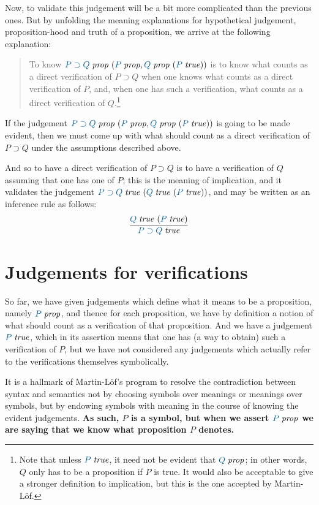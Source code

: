 Now, to validate this judgement will be a bit more complicated than the
previous ones. But by unfolding the meaning explanations for hypothetical
judgement, proposition-hood and truth of a proposition, we arrive at the
following explanation:
\begin{quote}
  To know $\hyp{\isprop{P\supset Q}}{\isprop{P},\hyp{\isprop{Q}}{\istrue{P}}}$
  is to know what counts as a direct verification of $P\supset Q$ when one
  knows what counts as a direct verification of $P$, and, when one has such a
  verification, what counts as a direct verification of $Q$.\footnote{Note that
  unless $\istrue{P}$, it need not be evident that $\isprop{Q}$; in other
  words, $Q$ only has to be a proposition if $P$ is true. It would also be
  acceptable to give a stronger definition to implication, but this is the one
  accepted by Martin-L\"of.}
\end{quote}


If the judgement $\hyp{\isprop{P\supset
Q}}{\isprop{P},\hyp{\isprop{Q}}{\istrue{P}}}$ is going to be made evident, then
we must come up with what should count as a direct verification of $P\supset Q$
under the assumptions described above.

And so to have a direct verification of $P\supset Q$ is to have a
verification of $Q$ assuming that one has one of $P$; this is the
meaning of implication, and it validates the judgement
$\hyp{\istrue{P\supset Q}}{\hyp{\istrue{Q}}{\istrue{P}}}$, and may be
written as an inference rule as follows:
\[
  \infer{
    \istrue{P\supset Q}
  }{
    \hyp{\istrue{Q}}{\istrue{P}}
  }
\]

\section{Judgements for verifications}

So far, we have given judgements which define what it means to be a
proposition, namely $\isprop{P}$, and thence for each proposition, we
have by definition a notion of what should count as a verification of
that proposition. And we have a judgement $\istrue{P}$, which in its
assertion means that one has (a way to obtain) such a verification of
$P$, but we have not considered any judgements which actually refer to
the verifications themselves symbolically.

It is a hallmark of Martin-L\"of's program to resolve the
contradiction between syntax and semantics not by choosing symbols
over meanings or meanings over symbols, but by endowing symbols with
meaning in the course of knowing the evident judgements. \textbf{As
such, $P$ is a symbol, but when we assert $\isprop{P}$ we are saying
that we know what proposition $P$ denotes.}

